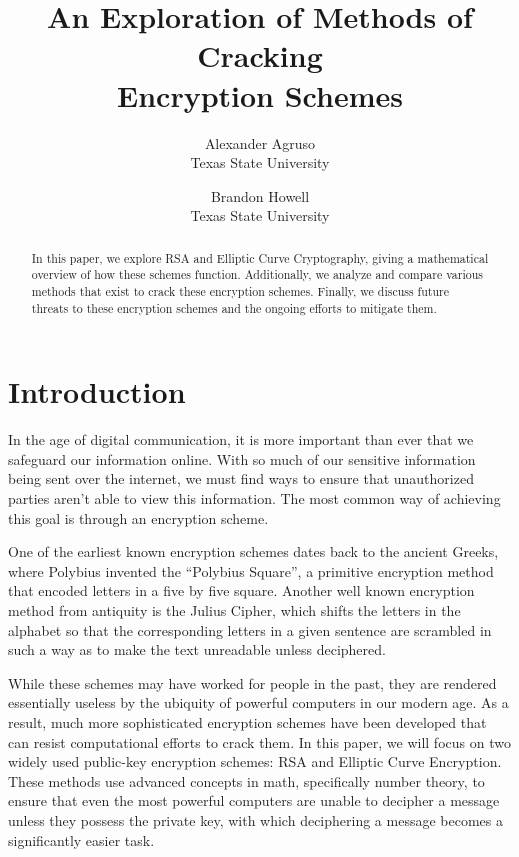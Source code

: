 \documentclass[letterpaper,twocolumn,12pt]{article}
\begin{document}
    \date{}

    \title{ An Exploration of Methods of Cracking \\
        Encryption Schemes }

    \author{
        { \rm Alexander Agruso } \\
        { \rm Texas State University }
        \and
        { \rm Brandon Howell } \\
        { \rm Texas State University }
    }

    \maketitle

    \begin{abstract}
        In this paper, we explore RSA and Elliptic Curve Cryptography, giving a
        mathematical overview of how these schemes function.
        Additionally, we analyze and compare various methods that exist to
        crack these encryption schemes.
        Finally, we discuss future threats to these encryption schemes
        and the ongoing efforts to mitigate them.
    \end{abstract}

    \section*{Introduction}

    In the age of digital communication, it is more important than ever that we
    safeguard our information online.
    With so much of our sensitive information being sent over the internet, we
    must find ways to ensure that unauthorized parties aren't able to view this
    information.
    The most common way of achieving this goal is through an encryption scheme.
    
    One of the earliest known encryption schemes dates back to the ancient
    Greeks, where Polybius invented the ``Polybius Square'', a primitive
    encryption method that encoded letters in a five by five square.
    Another well known encryption method from antiquity is the Julius Cipher,
    which shifts the letters in the alphabet so that the corresponding letters
    in a given sentence are scrambled in such a way as to make the text
    unreadable unless deciphered.
    ~\cite{JD:History}

    While these schemes may have worked for people in the past, they are
    rendered essentially useless by the ubiquity of powerful computers in our
    modern age.
    As a result, much more sophisticated encryption schemes have been developed
    that can resist computational efforts to crack them. In this paper, we will
    focus on two widely used public-key encryption schemes: RSA and Elliptic
    Curve Encryption.
    These methods use advanced concepts in math, specifically number theory, to
    ensure that even the most powerful computers are unable to decipher a
    message unless they possess the private key, with which deciphering a
    message becomes a significantly easier task.
    
\end{document}

